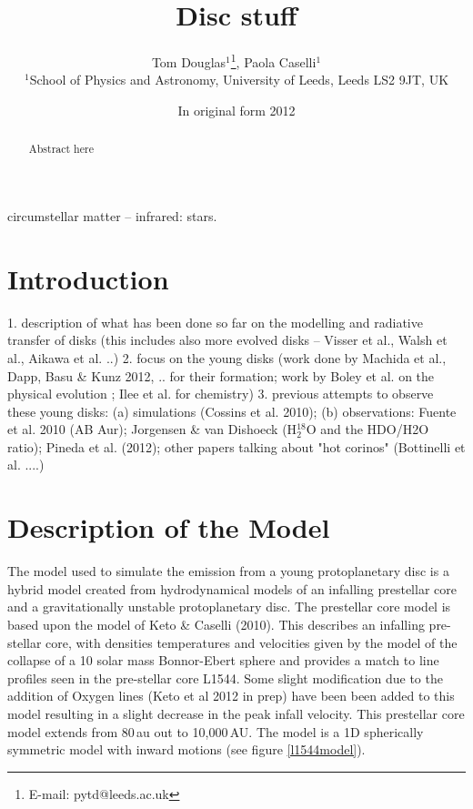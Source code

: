 \documentclass[useAMS,usenatbib]{mn2e}
\title[Disc stuff]{Disc stuff}
\author[Tom  Douglas, Paola Caselli, Et al.]{Tom Douglas$^{1}$\thanks{E-mail:
pytd@leeds.ac.uk}, Paola Caselli$^{1}$\\
$^{1}$School of Physics and Astronomy, University of Leeds, Leeds LS2 9JT, UK}
\begin{document}
\date{In original form 2012}

\pagerange{\pageref{firstpage}--\pageref{lastpage}} 

\maketitle

\label{firstpage}

\begin{abstract}
Abstract here
\end{abstract}

\begin{keywords}
circumstellar matter -- infrared: stars.
\end{keywords}

\section{Introduction}

1. description of what has been done so far on the modelling and radiative transfer of disks (this includes also more evolved disks -- Visser et al., Walsh et al., Aikawa et al. ..)
2. focus on the young disks (work done by Machida et al., Dapp, Basu \& Kunz 2012, .. for their formation; work by Boley et al. on the physical evolution ; Ilee et al. for chemistry) 
3. previous attempts to observe these young disks: (a) simulations (Cossins et al. 2010); (b) observations: Fuente et al. 2010 (AB Aur); Jorgensen \& van Dishoeck (H$_2^{18}$O and the HDO/H2O ratio); Pineda et al. (2012); other papers talking about "hot corinos" (Bottinelli et al. ....)

\section{Description of the Model}

The model used to simulate the emission from a young protoplanetary disc is a hybrid model created from hydrodynamical models of an infalling prestellar core and a gravitationally unstable protoplanetary disc. The prestellar core model is based upon the model of Keto \& Caselli (2010). This describes an infalling pre-stellar core, with densities temperatures and velocities given by the model of the collapse of a 10 solar mass Bonnor-Ebert sphere and provides a match to line profiles seen in the pre-stellar core L1544. Some slight modification due to the addition of Oxygen lines (Keto et al 2012 in prep) have been been added to this model resulting in a slight decrease in the peak infall velocity. This prestellar core model extends from 80$\,$au out to 10,000$\,$AU. The model is a 1D spherically symmetric model with inward motions (see figure \ref{l1544model}).\newline
\end{document}
